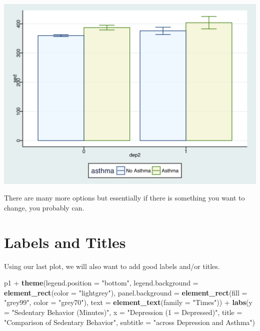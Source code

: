 \documentclass[]{tufte-book}
\newenvironment{Shaded}{}{}
\newcommand{\KeywordTok}[1]{\textcolor[rgb]{0.00,0.44,0.13}{\textbf{#1}}}
\newcommand{\DataTypeTok}[1]{\textcolor[rgb]{0.56,0.13,0.00}{#1}}
\newcommand{\StringTok}[1]{\textcolor[rgb]{0.25,0.44,0.63}{#1}}
\newcommand{\OperatorTok}[1]{\textcolor[rgb]{0.40,0.40,0.40}{#1}}
\newcommand{\NormalTok}[1]{#1}
\theoremstyle{definition}
\theoremstyle{definition}
\theoremstyle{remark}
\begin{document}
\includegraphics{_main_files/figure-latex/unnamed-chunk-153-1}

There are many more options but essentially if there is something you
want to change, you probably can.

\section*{Labels and Titles}\label{labels-and-titles}

Using our last plot, we will also want to add good labels and/or titles.

\begin{Shaded}
\begin{Highlighting}[]
\NormalTok{p1 }\OperatorTok{+}\StringTok{ }\KeywordTok{theme}\NormalTok{(}\DataTypeTok{legend.position =} \StringTok{"bottom"}\NormalTok{, }\DataTypeTok{legend.background =} \KeywordTok{element_rect}\NormalTok{(}\DataTypeTok{color =} \StringTok{"lightgrey"}\NormalTok{), }
    \DataTypeTok{panel.background =} \KeywordTok{element_rect}\NormalTok{(}\DataTypeTok{fill =} \StringTok{"grey99"}\NormalTok{, }
        \DataTypeTok{color =} \StringTok{"grey70"}\NormalTok{), }\DataTypeTok{text =} \KeywordTok{element_text}\NormalTok{(}\DataTypeTok{family =} \StringTok{"Times"}\NormalTok{)) }\OperatorTok{+}\StringTok{ }
\StringTok{    }\KeywordTok{labs}\NormalTok{(}\DataTypeTok{y =} \StringTok{"Sedentary Behavior (Minutes)"}\NormalTok{, }\DataTypeTok{x =} \StringTok{"Depression (1 = Depressed)"}\NormalTok{, }
        \DataTypeTok{title =} \StringTok{"Comparison of Sedentary Behavior"}\NormalTok{, }
        \DataTypeTok{subtitle =} \StringTok{"across Depression and Asthma"}\NormalTok{)}
\end{Highlighting}
\end{Shaded}
\end{document}

